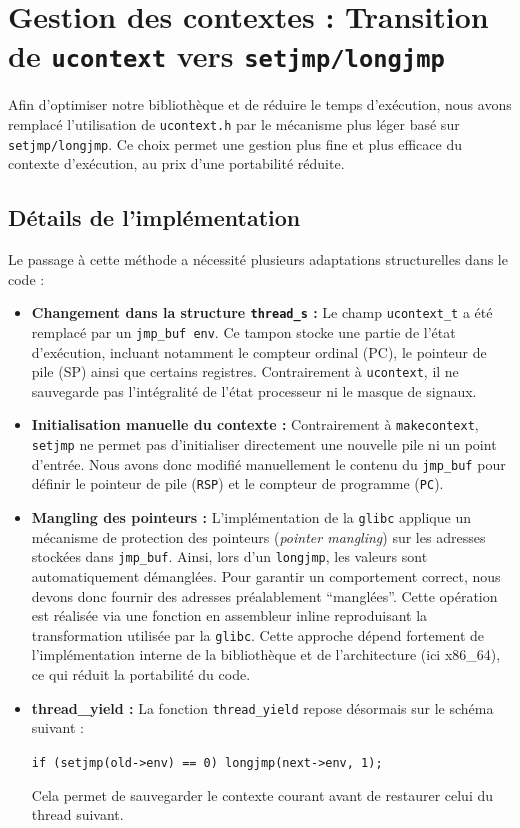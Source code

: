 \section{Gestion des contextes : Transition de \texttt{ucontext} vers \texttt{setjmp/longjmp}}

Afin d'optimiser notre bibliothèque et de réduire le temps d'exécution, nous
avons remplacé l'utilisation de \texttt{ucontext.h} par le mécanisme plus
léger basé sur \texttt{setjmp/longjmp}. Ce choix permet une gestion plus fine
et plus efficace du contexte d'exécution, au prix d'une portabilité réduite.

\subsection{Détails de l'implémentation}

Le passage à cette méthode a nécessité plusieurs adaptations structurelles
dans le code :
\begin{itemize}
    \item \textbf{Changement dans la structure \texttt{thread\_s} :} Le champ
    \texttt{ucontext\_t} a été remplacé par un \texttt{jmp\_buf env}. Ce
    tampon stocke une partie de l'état d'exécution, incluant notamment le
    compteur ordinal (PC), le pointeur de pile (SP) ainsi que certains
    registres. Contrairement à \texttt{ucontext}, il ne sauvegarde pas
    l'intégralité de l'état processeur ni le masque de signaux.

    \item \textbf{Initialisation manuelle du contexte :} Contrairement à
    \texttt{makecontext}, \texttt{setjmp} ne permet pas d'initialiser
    directement une nouvelle pile ni un point d'entrée. Nous avons donc
    modifié manuellement le contenu du \texttt{jmp\_buf} pour définir le
    pointeur de pile (\texttt{RSP}) et le compteur de programme (\texttt{PC}).

    \item \textbf{Mangling des pointeurs :} L'implémentation de la
    \texttt{glibc} applique un mécanisme de protection des pointeurs
    (\textit{pointer mangling}) sur les adresses stockées dans \texttt{jmp\_buf}.
    Ainsi, lors d'un \texttt{longjmp}, les valeurs sont automatiquement
    démanglées. Pour garantir un comportement correct, nous devons donc fournir
    des adresses préalablement ``manglées''. Cette opération est réalisée via
    une fonction en assembleur inline reproduisant la transformation utilisée
    par la \texttt{glibc}. Cette approche dépend fortement de l'implémentation
    interne de la bibliothèque et de l'architecture (ici x86\_64), ce qui
    réduit la portabilité du code.

    \item \textbf{thread\_yield :} La fonction \texttt{thread\_yield} repose
    désormais sur le schéma suivant :
    \begin{center}
    \texttt{if (setjmp(old->env) == 0) longjmp(next->env, 1);}
    \end{center}
    Cela permet de sauvegarder le contexte courant avant de restaurer celui
    du thread suivant.
\end{itemize}

